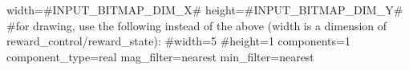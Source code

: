 width=#INPUT_BITMAP_DIM_X#
height=#INPUT_BITMAP_DIM_Y#
#for drawing, use the following instead of the above (width is a dimension of reward_control/reward_state):
#width=5
#height=1
components=1
component_type=real
mag_filter=nearest
min_filter=nearest
